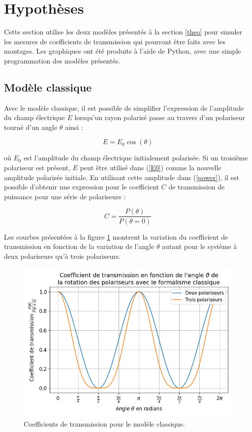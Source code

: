 \documentclass[11pt,letterpaper]{article}
\begin{document}
\section{Hypothèses}

Cette section utilise les deux modèles présentés à la section \ref{theo} pour simuler les mesures de
coefficients de transmission qui pourront être faits avec les montages. Les graphiques ont été produits
à l'aide de Python, avec une simple programmation des modèles présentés.

\subsection{Modèle classique}

Avec le modèle classique, il est possible de simplifier l'expression de l'amplitude du champ électrique
$E$ lorsqu'un rayon polarisé passe au travers d'un polariseur tourné d'un angle $\theta$ ainsi :

\begin{equation}\label{E0}
  E = E_{0}\cos\left( \theta \right)
\end{equation}

où $E_{0}$ est l'amplitude du champ électrique initialement polarisée. Si un troisième polariseur est
présent, $E$ peut être utilisé dans (\ref{E0}) comme la nouvelle amplitude polarisée initiale. En utilisant
cette amplitude dans (\ref{power}), il est possible d'obtenir une expression pour le coefficient $C$ de transmission
de puissance pour une série de polariseurs :

\begin{equation}
  C = \frac{P\left( \theta \right)}{P\left( \theta= 0 \right)}
\end{equation}

Les courbes présentées à la figure \ref{classique} montrent la variation
du coefficient de transmission en fonction de la variation de l'angle $\theta$ autant pour le 
système à deux polariseurs qu'à trois polariseurs.

\begin{figure}[H]
  \centering
  \includegraphics[scale=0.7]{coeff_classique.png}
  \caption{Coefficients de transmission pour le modèle classique.}
  \label{classique}
\end{figure}
\end{document}
